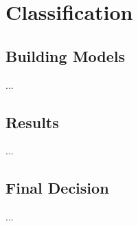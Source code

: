 \section{Classification}
\subsection{Building Models}
... 

\subsection{Results}
... 

\subsection{Final Decision}
... 

